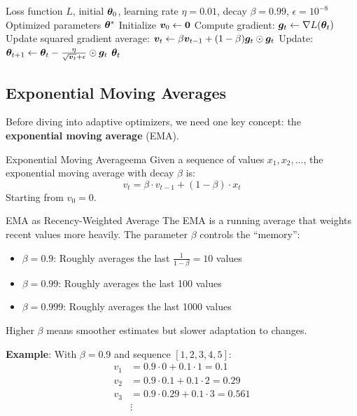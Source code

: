 \documentclass[../../main.tex]{subfiles}
\begin{document}
\begin{algorithm}[htbp]
\caption{RMSprop}
\label{alg:rmsprop-ch12}
\begin{algorithmic}[1]
\Require Loss function $L$, initial $\boldsymbol{\theta}_0$, learning rate $\eta = 0.01$, decay $\beta = 0.99$, $\epsilon = 10^{-8}$
\Ensure Optimized parameters $\boldsymbol{\theta}^*$
\State Initialize $\boldsymbol{v}_0 \gets \mathbf{0}$
    \State Compute gradient: $\boldsymbol{g}_t \gets \nabla L(\boldsymbol{\theta}_t)$
    \State Update squared gradient average: $\boldsymbol{v}_t \gets \beta \boldsymbol{v}_{t-1} + (1-\beta) \boldsymbol{g}_t \odot \boldsymbol{g}_t$
    \State Update: $\boldsymbol{\theta}_{t+1} \gets \boldsymbol{\theta}_t - \frac{\eta}{\sqrt{\boldsymbol{v}_t} + \epsilon} \odot \boldsymbol{g}_t$
\EndFor
\State \Return $\boldsymbol{\theta}_t$
\end{algorithmic}
\end{algorithm}

\subsection{Exponential Moving Averages}\label{sec:ema-intro}

Before diving into adaptive optimizers, we need one key concept: the \textbf{exponential moving average} (EMA).

\begin{definition}{Exponential Moving Average}{ema}
Given a sequence of values $x_1, x_2, \ldots$, the exponential moving average with decay $\beta$ is:
\[
v_t = \beta \cdot v_{t-1} + (1 - \beta) \cdot x_t
\]
Starting from $v_0 = 0$.
\end{definition}

\begin{intuition}{EMA as Recency-Weighted Average}
The EMA is a running average that weights recent values more heavily. The parameter $\beta$ controls the ``memory'':
\begin{itemize}
    \item $\beta = 0.9$: Roughly averages the last $\frac{1}{1-\beta} = 10$ values
    \item $\beta = 0.99$: Roughly averages the last 100 values
    \item $\beta = 0.999$: Roughly averages the last 1000 values
\end{itemize}
Higher $\beta$ means smoother estimates but slower adaptation to changes.
\end{intuition}

\textbf{Example}: With $\beta = 0.9$ and sequence $[1, 2, 3, 4, 5]$:
\begin{align*}
v_1 &= 0.9 \cdot 0 + 0.1 \cdot 1 = 0.1 \\
v_2 &= 0.9 \cdot 0.1 + 0.1 \cdot 2 = 0.29 \\
v_3 &= 0.9 \cdot 0.29 + 0.1 \cdot 3 = 0.561 \\
&\vdots
\end{align*}
\end{document}
